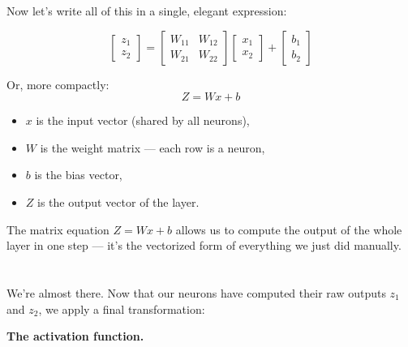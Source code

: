 \documentclass[11pt]{article}
\begin{document}
Now let’s write all of this in a single, elegant expression:

\[
\begin{bmatrix}
z_1 \\
z_2
\end{bmatrix}
=
\begin{bmatrix}
W_{11} & W_{12} \\
W_{21} & W_{22}
\end{bmatrix}
\begin{bmatrix}
x_1 \\
x_2
\end{bmatrix}
+
\begin{bmatrix}
b_1 \\
b_2
\end{bmatrix}
\]

Or, more compactly:
\[
Z = W x + b
\]

\vspace{1em}

\begin{tcolorbox}[colback=blue!5, colframe=blue!80!black, title=Notation Guide]
\begin{itemize}
  \item $x$ is the input vector (shared by all neurons),
  \item $W$ is the weight matrix — each row is a neuron,
  \item $b$ is the bias vector,
  \item $Z$ is the output vector of the layer.
\end{itemize}
\end{tcolorbox}

\vspace{1em}

\begin{tcolorbox}[colback=green!5!white, colframe=green!50!black, title=Key Insight]
The matrix equation $Z = Wx + b$ allows us to compute the output of the whole layer in one step —  
it’s the vectorized form of everything we just did manually.
\end{tcolorbox}

\section*{}

We’re almost there.  
Now that our neurons have computed their raw outputs $z_1$ and $z_2$, we apply a final transformation:

\begin{center}
    \textbf{The activation function.}
\end{center}
\end{document}
